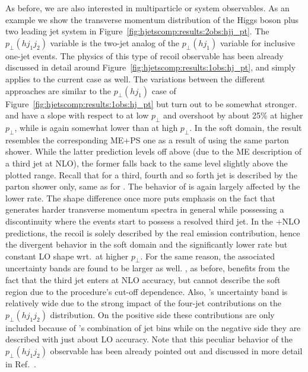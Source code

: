 As before, we are also interested in multiparticle or system
observables. As an example we show the transverse momentum
distribution of the Higgs boson plus two leading jet system in
Figure~\ref{fig:hjetscomp:results:2obs:hjj_pt}. The $p_\perp(hj_1j_2)$
variable is the two-jet analog of the $p_\perp(hj_1)$ variable for
inclusive one-jet events. The physics of this type of recoil
observable has been already discussed in detail around
Figure~\ref{fig:hjetscomp:results:1obs:hj_pt}, and simply applies to
the current case as well. The variations between the different
approaches are similar to the $p_\perp(hj_1)$ case of
Figure~\ref{fig:hjetscomp:results:1obs:hj_pt} but turn out
to be somewhat stronger. \MGaMC and \Sherpa have a slope with respect
to \Powheg at low $p_\perp$ and overshoot by about 25\% at higher
$p_\perp$, while \Herwig is again somewhat lower than \Powheg at high
$p_\perp$. In the soft domain, the \Sherpa \NNLOPS result resembles
the corresponding ME+PS one as a result of using the same parton
shower. While the latter prediction levels off above \Powheg (due to
the ME description of a third jet at NLO), the former falls back to
the same level slightly above the plotted range. Recall that for 
\Sherpa \NNLOPS a third, fourth and so
forth jet is described by the parton shower only, same as for \Powheg.
The behavior of \Hej is again largely affected by the lower rate. The
shape difference once more puts emphasis on the fact that \Hej
generates harder transverse momentum spectra in general while possessing 
a discontinuity where the events start to possess a resolved third jet. 
In the \GoSam{}+\Sherpa NLO predictions, the recoil is solely
described by the real emission contribution, hence the divergent
behavior in the soft domain and the significantly lower rate but
constant LO shape wrt.~\Powheg at higher $p_\perp$. For the same
reason, the associated uncertainty bands are found to be larger as
well. \Loopsim, as before, benefits from the fact that the third
jet enters at NLO accuracy, but cannot describe the soft region due to
the procedure's cut-off dependence. Also, \Loopsim's uncertainty band
is relatively wide due to the strong impact of the four-jet
contributions on the $p_\perp(hj_1j_2)$ distribution. On the positive
side these contributions are only included because of \Loopsim's
combination of jet bins while on the negative side they are described
with just about LO accuracy. Note that this peculiar behavior of the
$p_\perp(hj_1j_2)$ observable has been already pointed out and
discussed in more detail in Ref.~\cite{Greiner:2015jha}.

